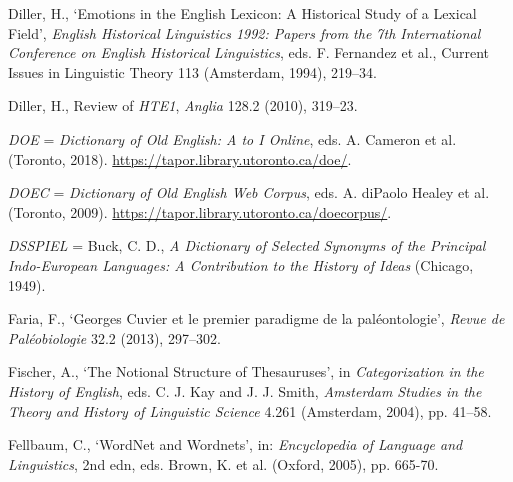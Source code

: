\begin{list}{}
\item %
Diller, H., `Emotions in the English Lexicon: A Historical Study of a Lexical Field', \textit{English Historical Linguistics 1992: Papers from the 7th International Conference on English Historical Linguistics}, eds. F. Fernandez et al., Current Issues in Linguistic Theory 113 (Amsterdam, 1994), 219–34.

\item %
Diller, H., Review of \textit{HTE1}, \textit{Anglia} 128.2 (2010), 319–23.

\item %
\textit{DOE} = \textit{Dictionary of Old English: A to I Online}, eds. A. Cameron et al. (Toronto, 2018). \url{https://tapor.library.utoronto.ca/doe/}.

\item %
\textit{DOEC} = \textit{Dictionary of Old English Web Corpus}, eds. A. diPaolo Healey et al. (Toronto, 2009). \url{https://tapor.library.utoronto.ca/doecorpus/}.

\item %
\textit{DSSPIEL} = Buck, C. D., \textit{A Dictionary of Selected Synonyms of the Principal Indo-European Languages: A Contribution to the History of Ideas} (Chicago, 1949). 

\item %
Faria, F., `Georges Cuvier et le premier paradigme de la paléontologie', \textit{Revue de Paléobiologie} 32.2 (2013), 297–302.

\item %
Fischer, A., `The Notional Structure of Thesauruses', in \textit{Categorization in the History of English}, eds. C. J. Kay and J. J. Smith, \textit{Amsterdam Studies in the Theory and History of Linguistic Science} 4.261 (Amsterdam, 2004), pp. 41–58.

\item %
Fellbaum, C., `WordNet and Wordnets', in: \textit{Encyclopedia of Language and Linguistics}, 2nd edn, eds. Brown, K. et al. (Oxford, 2005), pp. 665-70.




\end{list}
